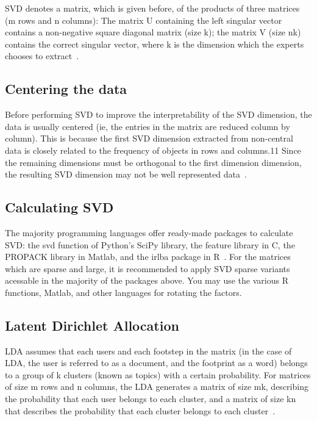 SVD denotes a matrix, which is given before, of the products of 
three matrices 
(m rows
 and n columns): The matrix U containing the left 
singular vector contains a non-negative square diagonal matrix 
(size k); the matrix V (size nk) contains the correct singular 
vector, where k is the dimension which the experts chooses to 
extract~\cite{hid515-12}. 

\subsection{Centering the data~\cite{hid515-12}}

Before performing SVD to improve the interpretability of the SVD 
dimension, the data is usually centered (ie, the entries in the 
matrix are reduced column by column). This is because the first SVD
 dimension extracted from non-central data is closely related to 
the frequency of objects in rows and columns.11 Since the remaining
 dimensions must be orthogonal to the first dimension dimension, 
the resulting SVD dimension may not be well represented 
data~\cite{hid515-12}.

\subsection{Calculating SVD~\cite{hid515-12}}

The majority programming languages offer ready-made packages to 
calculate SVD: the svd function of Python's SciPy library, the 
feature library in C, the PROPACK library in Matlab, and the 
irlba package in R~\cite{hid515-12}. 
For the matrices which are sparse and large, it is 
recommended to apply SVD sparse variants acessable in the majority
 of the packages above. 
You may use the various R functions, Matlab, and other languages 
for rotating the factors.

\subsection{Latent Dirichlet Allocation~\cite{hid515-12}}

LDA assumes that each users and each footstep in the matrix (in the
 case of LDA, the user is referred to as a document, and the 
footprint as a word) belongs to a group of k clusters (known as 
topics) with a certain probability. For matrices of size m rows and
 n columns, the LDA generates a matrix of size mk, describing the 
probability that each user belongs to each cluster, and a matrix of
 size kn that describes the probability that each cluster belongs 
to each cluster~\cite{hid515-12}. 

